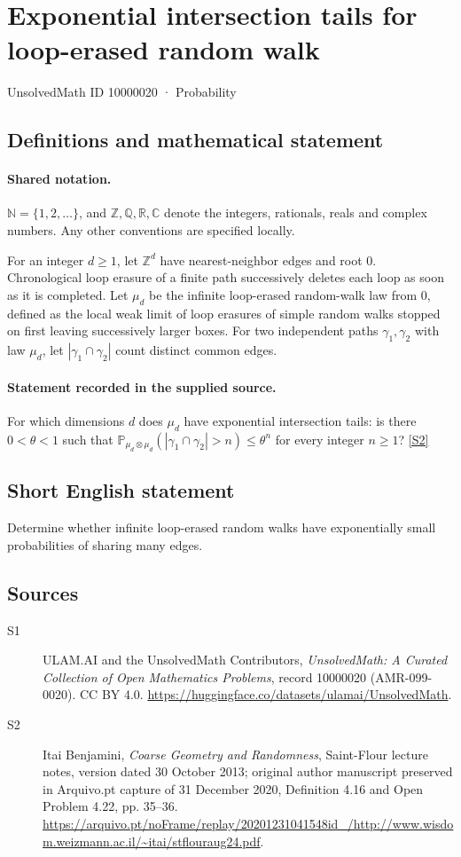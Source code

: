 \documentclass[11pt]{article}
\newcommand{\sref}[2]{\hyperlink{source:#1:#2}{[S#2]}}
\begin{document}
\setcounter{section}{10000019}
\section{Exponential intersection tails for loop-erased random walk}\label{10000020}
{\small\sffamily UnsolvedMath ID 10000020 · Probability}
\subsection{Definitions and mathematical statement}

\paragraph{Shared notation.}$\mathbb N=\{1,2,\ldots\}$, and $\mathbb Z,\mathbb Q,\mathbb R,\mathbb C$ denote the integers, rationals, reals and complex numbers. Any other conventions are specified locally.


For an integer $d\ge1$, let $\mathbb Z^d$ have nearest-neighbor edges and root $0$. Chronological loop erasure of a finite path successively deletes each loop as soon as it is completed. Let $\mu_d$ be the infinite loop-erased random-walk law from $0$, defined as the local weak limit of loop erasures of simple random walks stopped on first leaving successively larger boxes. For two independent paths $\gamma_1,\gamma_2$ with law $\mu_d$, let $|\gamma_1\cap\gamma_2|$ count distinct common edges.
\paragraph{Statement recorded in the supplied source.}
For which dimensions $d$ does $\mu_d$ have exponential intersection tails: is there $0<\theta<1$ such that $\mathbb P_{\mu_d\otimes\mu_d}(|\gamma_1\cap\gamma_2|>n)\le\theta^n$ for every integer $n\ge1$? \sref{10000020}{2}
\subsection{Short English statement}
Determine whether infinite loop-erased random walks have exponentially small probabilities of sharing many edges.
\subsection{Sources}
\begin{description}
\item[\hypertarget{source:10000020:1}{S1}] ULAM.AI and the UnsolvedMath Contributors, \emph{UnsolvedMath: A Curated Collection of Open Mathematics Problems}, record 10000020 (AMR-099-0020). CC BY 4.0. \url{https://huggingface.co/datasets/ulamai/UnsolvedMath}.
\item[\hypertarget{source:10000020:2}{S2}] Itai Benjamini, \emph{Coarse Geometry and Randomness}, Saint-Flour lecture notes, version dated 30 October 2013; original author manuscript preserved in Arquivo.pt capture of 31 December 2020, Definition 4.16 and Open Problem 4.22, pp. 35--36. \url{https://arquivo.pt/noFrame/replay/20201231041548id_/http://www.wisdom.weizmann.ac.il/~itai/stflouraug24.pdf}.
\end{description}
\label{end:10000020}
\end{document}
